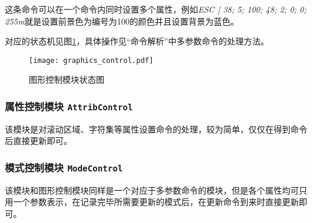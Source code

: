 这条命令可以在一个命令内同时设置多个属性，例如{\it ESC [ 38; 5; 100; 48; 2; 0; 0; 255m}就是设置前景色为编号为100的颜色并且设置背景为蓝色。

	对应的状态机见图\ref{fig:graphics_control}，具体操作见``命令解析''中多参数命令的处理方法。
\begin{figure}[htbp]
\centerline{
\texttt{[image: graphics\_control.pdf]}
}
\caption{图形控制模块状态图}
\label{fig:graphics_control}
\end{figure}
\subsubsection{属性控制模块 \texttt{AttribControl}}
该模块是对滚动区域、字符集等属性设置命令的处理，较为简单，仅仅在得到命令后直接更新即可。
\subsubsection{模式控制模块 \texttt{ModeControl}}
该模块和图形控制模块同样是一个对应于多参数命令的模块，但是各个属性均可只用一个参数表示，在记录完毕所需要更新的模式后，在更新命令到来时直接更新即可。